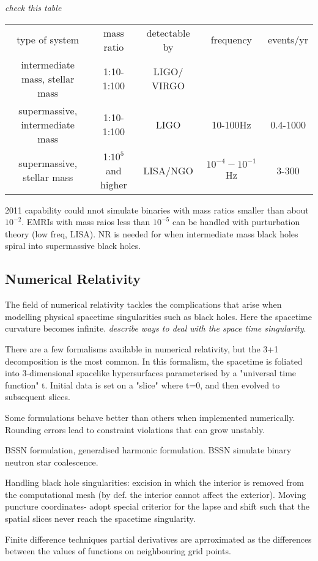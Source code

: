 \documentclass{article}
\begin{document}
\textit{check this table}

\begin{tabular}{ccccc}
type of system & mass ratio & detectable by & frequency & events/yr\\
intermediate mass, stellar mass & 1:10-1:100 & LIGO/ VIRGO\\
supermassive, intermediate mass & 1:10-1:100 & LIGO & 10-100Hz & 0.4-1000\\
supermassive, stellar mass & 1:$10^5$ and higher & LISA/NGO &  $10^{-4}-10^{-1}$ Hz & 3-300 
\end{tabular}
2011 capability could nnot simulate binaries with mass ratios smaller than about $10^{-2}$. EMRIs with mass raios less than $10^{-5}$ can be handled with purturbation theory (low freq, LISA). NR is needed for when intermediate mass black holes spiral into supermassive black holes.

\subsection{Numerical Relativity}
The field of numerical relativity tackles the complications that arise when modelling physical spacetime singularities such as black holes. Here the spacetime curvature becomes infinite. \textit{describe ways to deal with the space time singularity}.

There are a few formalisms available in numerical relativity, but the 3+1 decomposition is the most common. In this formalism, the spacetime is foliated into 3-dimensional spacelike hypersurfaces parameterised by a "universal time function" t. Initial data is set on a "slice" where t=0, and then evolved to subsequent slices. 

Some formulations behave better than others when implemented numerically. Rounding errors lead to constraint violations that can grow unstably.

BSSN formulation, generalised harmonic formulation. BSSN simulate binary neutron star coalescence. 

Handling black hole singularities: excision in which the interior is removed from the computational mesh (by def. the interior cannot affect the exterior). Moving puncture coordinates- adopt special criterior for the lapse and shift such that the spatial slices never reach the spacetime singularity. 

Finite difference techniques partial derivatives are aprroximated as the differences between the values of functions on neighbouring grid points.
\end{document}
